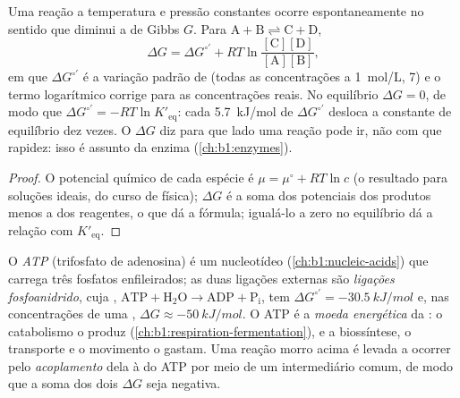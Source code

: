 \begin{proposition}\label{prop:b1:water-small-molecules:gibbs}
Uma reação a temperatura e pressão constantes ocorre espontaneamente no
sentido que diminui a  de Gibbs $G$. Para
$\mathrm{A} + \mathrm{B} \rightleftharpoons \mathrm{C} + \mathrm{D}$,
\[
\Delta G = \Delta G^{\circ\prime} + RT\ln\frac{[\mathrm{C}][\mathrm{D}]}{[\mathrm{A}][\mathrm{B}]},
\]
em que $\Delta G^{\circ\prime}$ é a variação padrão de 
(todas as concentrações a \qty{1}{mol/L},  7) e o termo logarítmico
corrige para as concentrações reais. No equilíbrio $\Delta G = 0$, de
modo que $\Delta G^{\circ\prime} = -RT\ln K'_{\text{eq}}$: cada
\qty{5.7}{kJ/mol} de $\Delta G^{\circ\prime}$ desloca a constante de
equilíbrio dez vezes. O $\Delta G$ diz para que lado uma reação pode ir,
não com que rapidez: isso é assunto da enzima (\cref{ch:b1:enzymes}).
\end{proposition}
\begin{proof}
O potencial químico de cada espécie é $\mu = \mu^\circ + RT\ln c$ (o
resultado para soluções ideais, do curso de física); $\Delta G$ é a soma
dos potenciais dos produtos menos a dos reagentes, o que dá a fórmula;
igualá-lo a zero no equilíbrio dá a relação com $K'_{\text{eq}}$.
\end{proof}

\begin{definition}\label{def:b1:water-small-molecules:atp}
O \emph{ATP} (trifosfato de adenosina) é um nucleotídeo
(\cref{ch:b1:nucleic-acids}) que carrega três fosfatos enfileirados; as
duas ligações externas são
\emph{ligações fosfoanidrido}, cuja
, $\mathrm{ATP} + \mathrm{H_2O} \to \mathrm{ADP} +
\mathrm{P_i}$, tem $\Delta G^{\circ\prime} = \qty{-30.5}{kJ/mol}$ e, nas
concentrações de uma , $\Delta G \approx \qty{-50}{kJ/mol}$. O ATP
é a \emph{moeda energética} da : o
catabolismo o produz (\cref{ch:b1:respiration-fermentation}), e a
biossíntese, o transporte e o movimento o gastam. Uma reação morro acima
é levada a ocorrer pelo \emph{acoplamento}
dela à  do ATP por meio de um intermediário comum, de modo que
a soma dos dois $\Delta G$ seja negativa.
\end{definition}

